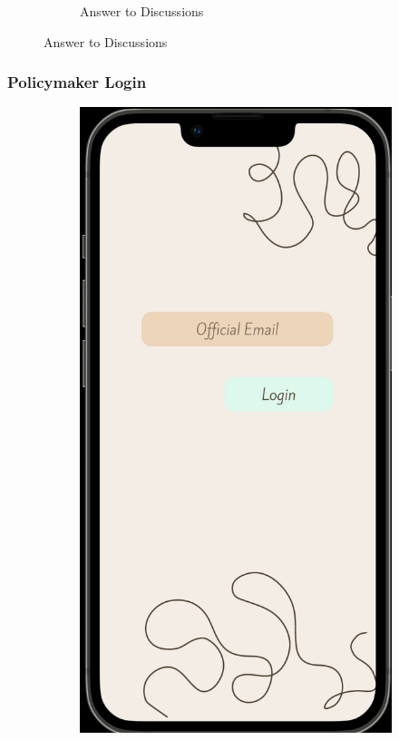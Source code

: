 \begin{figure}[ht]
\begin{subfigure}[b]{0.6\linewidth}
    \caption{Answer to Discussions} 
    \label{fig:b} 
    \vspace{4ex}
  \end{subfigure} 
  
  \label{fig:example_many_images} 
\end{figure}
\clearpage

    
\subsubsection{Policymaker Login}
\begin{figure}[ht] 
  \begin{subfigure}[b]{0.6\linewidth}
    \centering
    \includegraphics[width=0.8\linewidth]{figures/PolicymakerLogin.png}

\end{subfigure}
\end{figure}
